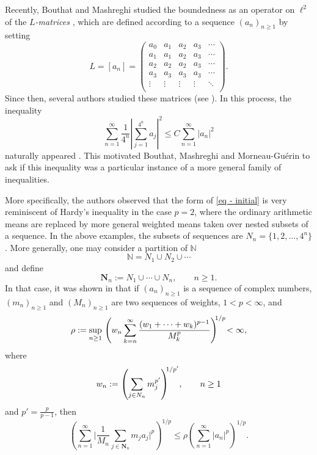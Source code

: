 \documentclass[oneside,10pt]{article}          %
\numberwithin{equation}{section}
\begin{document}
Recently, Bouthat and Mashreghi studied the boundedness as an operator on $\ell^2$ of the \emph{$L$-matrices} \cite{MRtmp}, which are defined according to a sequence $(a_n)_{n\geq 1}$ by setting
\[
L =[a_n]=
\begin{pmatrix}
a_0 & a_1 & a_2 & a_3 & \cdots \\
a_1 & a_1 & a_2 & a_3 & \cdots \\
a_2 & a_2 & a_2 & a_3 & \cdots \\
a_3 & a_3 & a_3 & a_3 & \cdots \\[-2pt]
\vdots & \vdots & \vdots & \vdots & \ddots \\
\end{pmatrix}.
\]
Since then, several authors studied these matrices (see \cite{MR4364583,MR4335803,MR4509958,MR4375658}). In this process, the inequality 
\begin{equation}\label{eq - initial}
    \sum_{n=1}^{\infty} \frac{1}{4^n} \left| \sum_{j=1}^{4^n} a_j \right|^2
\leq
C \sum_{n=1}^{\infty} |a_n|^2
\end{equation}
naturally appeared \cite{MR4364583}. This motivated Bouthat, Mashreghi and Morneau-Guérin to ask if this inequality was a particular instance of a more general family of inequalities. 

More specifically, the authors observed that the form of \eqref{eq - initial} is very reminiscent of Hardy's inequality in the case $p=2$, where the ordinary arithmetic means are replaced by more general weighted means taken over nested subsets of a sequence. In the above examples, the subsets of sequences are $N_n = \{1,2,\dots,4^n\}$. More generally, one may consider a partition of $\mathbb{N}$
\[
\mathbb{N} = N_1 \cup N_2 \cup \cdots
\]
and define
\[
\mathbf{N}_n := N_1\cup\cdots\cup N_n, \qquad n \geq 1.
\]
In that case, it was shown in \cite{Bouthat2023} that if $(a_n)_{n \geq 1}$ is a sequence of complex numbers, $(m_n)_{n \geq 1}$ and $(M_n)_{n \geq 1}$ are two sequences of weights, $1<p<\infty$, and\vspace{-2pt}
\begin{equation}\label{E:3}
\rho := \sup_{n \geq 1} \, \left(w_n \sum_{k=n}^{\infty}\frac{(w_1+\cdots+w_k)^{p-1}}{M_k^p}\right)^{\!\!1/p} \!< \infty,\vspace{-2pt}
\end{equation}
where
\begin{equation*}
w_n := \left(\sum_{j \in N_n} m_j^{p'} \right)^{\!\!1/p'}\!, \qquad n \geq 1\vspace{-2pt}
\end{equation*}
and $p'=\frac{p}{p-1}$, then\vspace{-4pt}
\[
\left(\sum_{n=1}^{\infty} \bigg|\frac{1}{M_n}\sum_{j \in \mathbf{N}_n} m_ja_j \bigg|^p\right)^{\!\!1/p}
\!\!\leq \rho  \left(\sum_{n=1}^{\infty} |a_n|^p\right)^{\!\!1/p}.
\]
\end{document}
